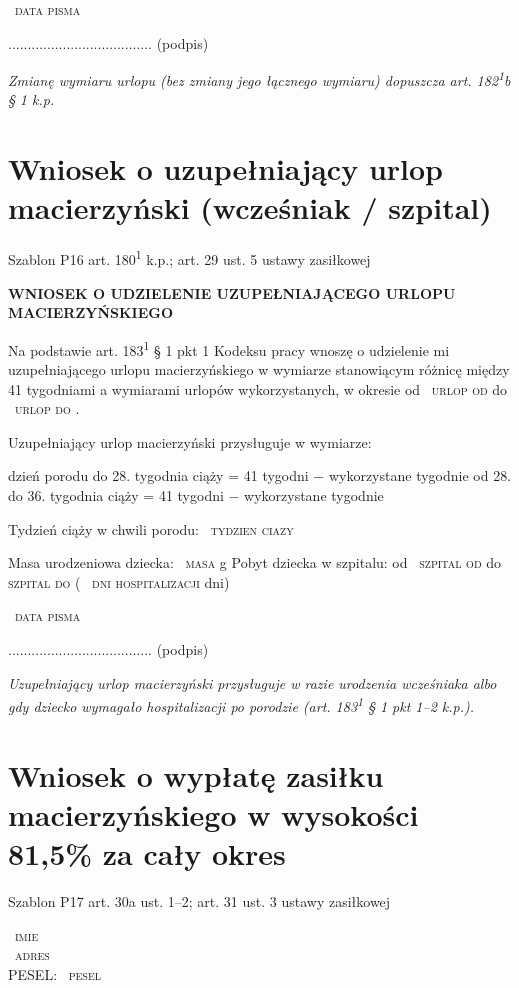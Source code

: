 \documentclass[11pt,a4paper]{article}
\newcommand{\Pole}[1]{%
  \textcolor{szary}{\dotfill}\,%
  {\scriptsize\textcolor{szary}{\textsc{#1}}}%
}
\newcommand{\NaglowekPisma}[1]{%
  \par\vspace{0.8em}%
  \begin{center}%
    {\large\bfseries\MakeUppercase{#1}}%
  \end{center}%
  \vspace{0.4em}%
}
\begin{document}
\Pole{data pisma}
.....................................
(podpis)

\vfill
{\footnotesize\color{szary}\itshape Zmianę wymiaru urlopu (bez zmiany jego łącznego wymiaru) dopuszcza art. 182\textsuperscript{1}b \S{} 1 k.p.}

\clearpage

\section{Wniosek o uzupełniający urlop macierzyński (wcześniak / szpital)}

{\small\color{szary}Szablon P16 \textbullet{} art. 180\textsuperscript{1} k.p.; art. 29 ust. 5 ustawy zasiłkowej}

\NaglowekPisma{WNIOSEK O UDZIELENIE UZUPEŁNIAJĄCEGO URLOPU MACIERZYŃSKIEGO}

Na podstawie art. 183\textsuperscript{1} \S{} 1 pkt 1 Kodeksu pracy wnoszę o udzielenie mi
uzupełniającego urlopu macierzyńskiego w wymiarze stanowiącym różnicę
między 41 tygodniami a wymiarami urlopów wykorzystanych, w okresie
od \Pole{urlop od} do \Pole{urlop do}.

Uzupełniający urlop macierzyński przysługuje w wymiarze:

dzień porodu do 28. tygodnia ciąży        = 41 tygodni − wykorzystane tygodnie
od 28. do 36. tygodnia ciąży             = 41 tygodni − wykorzystane tygodnie

Tydzień ciąży w chwili porodu: \Pole{tydzien ciazy}
Masa urodzeniowa dziecka: \Pole{masa} g
Pobyt dziecka w szpitalu: od \Pole{szpital od} do \Pole{szpital do}  (\Pole{dni hospitalizacji} dni)

\Pole{data pisma}
.....................................
(podpis)

\vfill
{\footnotesize\color{szary}\itshape Uzupełniający urlop macierzyński przysługuje w razie urodzenia wcześniaka albo gdy dziecko wymagało hospitalizacji po porodzie (art. 183\textsuperscript{1} \S{} 1 pkt 1--2 k.p.). }

\clearpage

\section{Wniosek o wypłatę zasiłku macierzyńskiego w wysokości 81,5\% za cały okres}

{\small\color{szary}Szablon P17 \textbullet{} art. 30a ust. 1--2; art. 31 ust. 3 ustawy zasiłkowej}

\Pole{imie}\\[-2pt]
\Pole{adres}\\[-2pt]
PESEL: \Pole{pesel}
\end{document}
